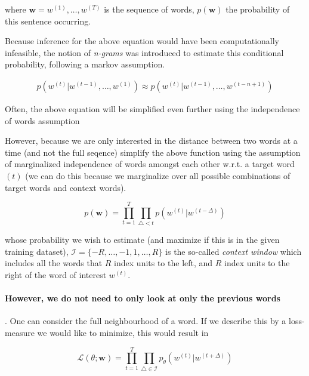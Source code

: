 \documentclass[a4paper,12pt,twoside,openright]{report}
\begin{document}

where $\mathbf{w} = w^{(1)}, \dots, w^{(T)} $ is the sequence of words, $p(\mathbf{w})$ the probability of this sentence occurring.

Because inference for the above equation would have been computationally infeasible, the notion of \textit{n-grams} was introduced to estimate this conditional probability, following a markov assumption.

\begin{align}
p\left( w^{(t)} | w^{(t -1)}, \ldots, w^{(1)} \right) \approx p\left( w^{(t)} | w^{(t -1)}, \ldots, w^{(t - n + 1)} \right)
\end{align}

Often, the above equation will be simplified even further using the independence of words assumption

However, because we are only interested in the distance between two words at a time (and not the full seqence) \cite{bengio03} simplify the above function using the assumption of marginalized independence of words amongst each other w.r.t. a target word $(t)$ (we can do this because we marginalize over all possible combinations of target words and context words).

\begin{equation}
p(\mathbf{w})=\prod_{t=1}^{T} \prod_{\triangle < t} p\left( w^{(t)} | w^{(t -\Delta)}\right)
\end{equation}{\label{eq:naive_sequential_probability}}


 whose probability we wish to estimate (and maximize if this is in the given training dataset), $\mathcal{I}=\{-R, \ldots,-1,1, \ldots, R\}$ is the so-called \textit{context window} which includes all the words that $R$ index units to the left, and $R$ index units to the right of the word of interest $w^(t)$.

\paragraph{However, we do not need to only look at only the previous words}.
One can consider the full neighbourhood of a word.
If we describe this by a loss-measure we would like to minimize, this would result in 


\begin{equation}
\mathcal{L}(\theta ; \mathbf{w})=\prod_{t=1}^{T} \prod_{\triangle \in \mathcal{I}} p_{\theta}\left(w^{(t)} | w^{(t +\Delta)}\right)
\end{equation}{\label{eq:basic_equation_log_maximization}}
\end{document}

